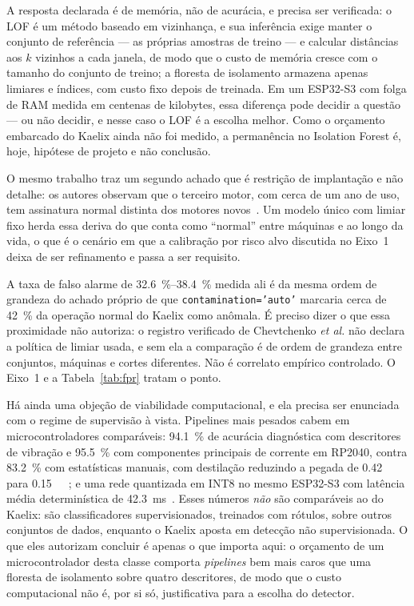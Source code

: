\documentclass[11pt,a4paper]{article}
\begin{document}
A resposta declarada é de memória, não de acurácia, e precisa ser verificada: o LOF é um
método baseado em vizinhança, e sua inferência exige manter o conjunto de referência ---
as próprias amostras de treino --- e calcular distâncias aos $k$ vizinhos a cada janela,
de modo que o custo de memória cresce com o tamanho do conjunto de treino; a floresta de
isolamento armazena apenas limiares e índices, com custo fixo depois de treinada. Em um
ESP32-S3 com folga de RAM medida em centenas de kilobytes, essa diferença pode decidir a
questão --- ou não decidir, e nesse caso o LOF é a escolha melhor. Como o orçamento
embarcado do Kaelix ainda não foi medido, a permanência no Isolation Forest é, hoje,
hipótese de projeto e não conclusão.

O mesmo trabalho traz um segundo achado que é restrição de implantação e não detalhe: os
autores observam que o terceiro motor, com cerca de um ano de uso, tem assinatura normal
distinta dos motores novos~\cite{chevtchenko2023}. Um modelo único com limiar fixo herda
essa deriva do que conta como ``normal'' entre máquinas e ao longo da vida, o que é o
cenário em que a calibração por risco alvo discutida no Eixo~1 deixa de ser refinamento e
passa a ser requisito.

A taxa de falso alarme de \SIrange{32,6}{38,4}{\percent} medida ali é da mesma ordem de
grandeza do achado próprio de que \texttt{contamination='auto'} marcaria cerca de
\SI{42}{\percent} da operação normal do Kaelix como anômala. É preciso dizer o que essa
proximidade não autoriza: o registro verificado de Chevtchenko \emph{et al.} não declara
a política de limiar usada, e sem ela a comparação é de ordem de grandeza entre conjuntos,
máquinas e cortes diferentes. Não é correlato empírico controlado. O Eixo~1 e a
Tabela~\ref{tab:fpr} tratam o ponto.

Há ainda uma objeção de viabilidade computacional, e ela precisa ser enunciada com o
regime de supervisão à vista. Pipelines mais pesados cabem em microcontroladores
comparáveis: \SI{94,1}{\percent} de acurácia diagnóstica com descritores de vibração e
\SI{95,5}{\percent} com componentes principais de corrente em RP2040, contra
\SI{83,2}{\percent} com estatísticas manuais, com destilação reduzindo a pegada de
\SI{0,42}{\mega\byte} para \SI{0,15}{\mega\byte}~\cite{uselis2025}; e uma rede quantizada
em INT8 no mesmo ESP32-S3 com latência média determinística de
\SI{42,3}{\milli\second}~\cite{kumar2026}. Esses números \emph{não} são comparáveis ao do
Kaelix: são classificadores supervisionados, treinados com rótulos, sobre outros conjuntos
de dados, enquanto o Kaelix aposta em detecção não supervisionada. O que eles autorizam
concluir é apenas o que importa aqui: o orçamento de um microcontrolador desta classe
comporta \emph{pipelines} bem mais caros que uma floresta de isolamento sobre quatro
descritores, de modo que o custo computacional não é, por si só, justificativa para a
escolha do detector.
\end{document}
